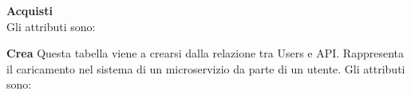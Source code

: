 {{		\textbf{Acquisti}\\
		Gli attributi sono: \\
		\begin{center}
		\begin{table}[H]\caption{Acquisti}
\label{a}
\end{table}
		\end{center}
			
		\textbf{Crea}
			Questa tabella viene a crearsi dalla relazione tra Users e API. Rappresenta il caricamento nel sistema di un microservizio da parte di un utente. Gli attributi sono:
			\begin{center}
			\begin{table}[H]\caption{Crea}
\label{cr}
\end{table}
			\end{center}
			
		}
	
}